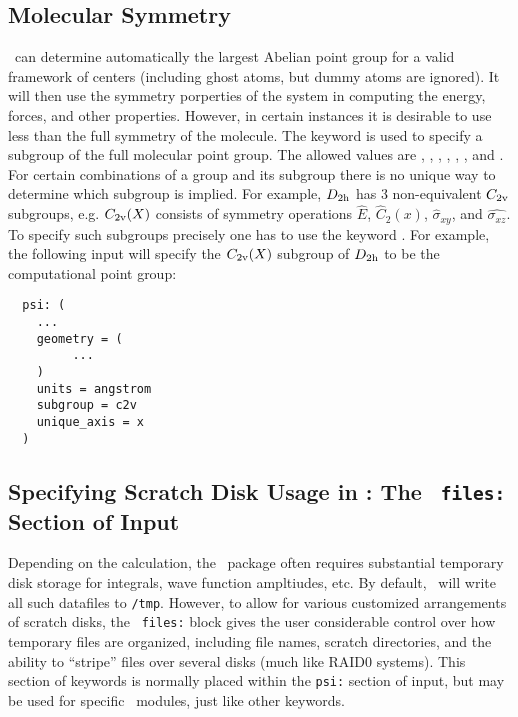 \subsection{Molecular Symmetry}
\PSIthree\ can determine automatically the largest Abelian point group
for a valid framework of centers (including ghost atoms, but dummy
atoms are ignored).  It will then use the symmetry porperties of the
system in computing the energy, forces, and other properties.
However, in certain instances it is desirable to use less than the
full symmetry of the molecule. The keyword  is used
to specify a subgroup of the full molecular point group. The allowed
values are , , , ,
, , and . For certain combinations
of a group and its subgroup there is no unique way to determine which
subgroup is implied. For example, $D_{\rm 2h}$ has 3 non-equivalent
$C_{\rm 2v}$ subgroups, e.g. $C_{\rm 2v}(X)$ consists of symmetry
operations $\hat{E}$, $\hat{C}_2(x)$, $\hat{\sigma}_{xy}$, and
$\hat{\sigma_{xz}}$.  To specify such subgroups precisely one has to
use the keyword .  For example, the following
input will specify the $C_{\rm 2v}(X)$ subgroup of $D_{\rm 2h}$ to be
the computational point group:
\begin{verbatim}
  psi: (
    ...
    geometry = (
         ...
    )
    units = angstrom
    subgroup = c2v
    unique_axis = x
  )
\end{verbatim}

\subsection{Specifying Scratch Disk Usage in \PSIthree: The {\tt
    files:} Section of Input} \label{scratchfiles}

Depending on the calculation, the \PSIthree\ package often requires
substantial temporary disk storage for integrals, wave function
ampltiudes, etc.  By default, \PSIthree\ will write all such datafiles
to {\tt /tmp}.  However, to allow for various customized arrangements
of scratch disks, the \PSIthree\ {\tt files:} block gives the user
considerable control over how temporary files are organized, including
file names, scratch directories, and the ability to ``stripe'' files
over several disks (much like RAID0 systems).  This section of
keywords is normally placed within the {\tt psi:} section of input,
but may be used for specific \PSIthree\ modules, just like other
keywords.

